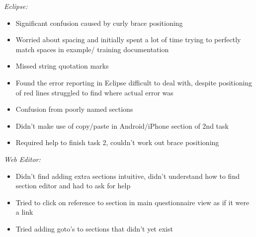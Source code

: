 \emph{Eclipse:}
\begin{itemize}
\item Significant confusion caused by curly brace positioning
\item Worried about spacing and initially spent a lot of time trying to perfectly match spaces in example/ training documentation
\item Missed string quotation marks
\item Found the error reporting in Eclipse difficult to deal with, despite positioning of red lines struggled to find where actual error was
\item Confusion from poorly named sections
\item Didn't make use of copy/paste in Android/iPhone section of 2nd task
\item Required help to finish task 2, couldn't work out brace positioning
\end{itemize}
\emph{Web Editor:}
\begin{itemize}
\item Didn't find adding extra sections intuitive, didn't understand how to find section editor and had to ask for help
\item Tried to click on reference to section in main questionnaire view as if it were a link
\item Tried adding goto's to sections that didn't yet exist
\end{itemize}

